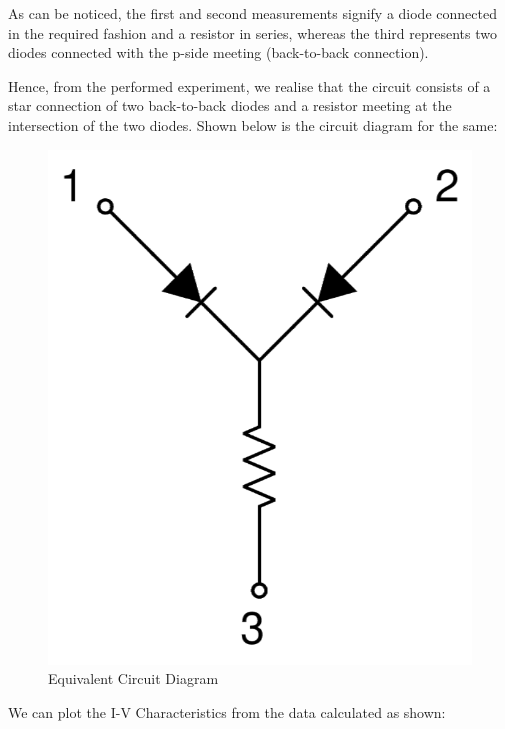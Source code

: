 \documentclass[12pt]{article}
\begin{document}
As can be noticed, the first and second measurements signify a diode connected in the required fashion and a resistor in series, whereas the third represents two diodes connected with the p-side meeting (back-to-back connection).

Hence, from the performed experiment, we realise that the circuit consists of a star connection of two back-to-back diodes and a resistor meeting at the intersection of the two diodes. Shown below is the circuit diagram for the same:

\begin{figure}[H]
	\centering
	\includegraphics[width = 0.25\linewidth, trim = {0 0 0 0}, clip]{Circuit_Diagram.png}
	\caption{Equivalent Circuit Diagram}
\end{figure}

We can plot the I-V Characteristics from the data calculated as shown:
\end{document}
